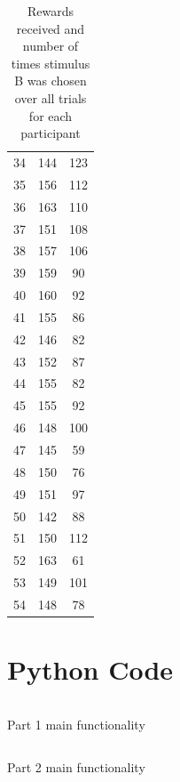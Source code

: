 \documentclass{article}
\begin{document}
\begin{appendices}
\begin{table}
\begin{tabular}{ccc}
      34 &  144 &  123 \\
      35 &  156 &  112 \\
      36 &  163 &  110 \\
      37 &  151 &  108 \\
      38 &  157 &  106 \\
      39 &  159 &   90 \\
      40 &  160 &   92 \\
      41 &  155 &   86 \\
      42 &  146 &   82 \\
      43 &  152 &   87 \\
      44 &  155 &   82 \\
      45 &  155 &   92 \\
      46 &  148 &  100 \\
      47 &  145 &   59 \\
      48 &  150 &   76 \\
      49 &  151 &   97 \\
      50 &  142 &   88 \\
      51 &  150 &  112 \\
      52 &  163 &   61 \\
      53 &  149 &  101 \\
      54 &  148 &   78 \\
      \bottomrule
    \end{tabular}
    \caption{Rewards received and number of times stimulus B was chosen over all trials for each participant}
    \label{table:participantcounts}
  \end{table}

\section{Python Code}

\begin{listing}
  \inputminted{python}{../part1helpers.py}
  \caption{Part 1 main functionality}
  \label{listing:part1functionality}
\end{listing}

\begin{listing}
  \inputminted{python}{../part2/part2helpers.py}
  \caption{Part 2 main functionality}
  \label{listing:part2functionality}
\end{listing}

\end{appendices}
\end{document}
